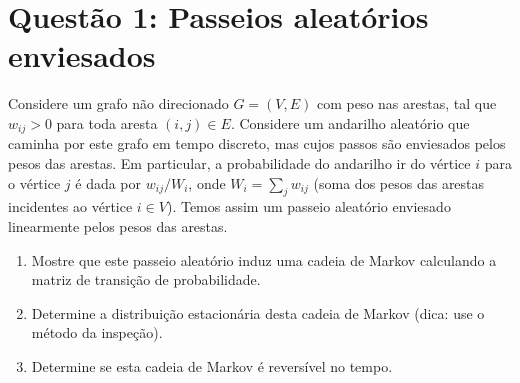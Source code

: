 \section*{Questão 1: Passeios aleatórios enviesados}
Considere um grafo não direcionado $G = (V,E)$ com peso nas arestas, tal que $w_{ij} > 0$ para toda aresta $(i, j) \in E$. Considere um andarilho aleatório que caminha por este grafo em tempo discreto, mas cujos passos são enviesados pelos pesos das arestas. Em particular, a probabilidade do andarilho ir do vértice $i$ para o vértice $j$ é dada por $w_{ij}/W_i$, onde $W_i = \sum_j w_{ij}$ (soma dos pesos das arestas incidentes ao vértice $i \in V$). Temos assim um passeio aleatório enviesado linearmente pelos pesos das arestas.

\begin{enumerate}
    \item Mostre que este passeio aleatório induz uma cadeia de Markov calculando a matriz de transição de probabilidade.
    \item Determine a distribuição estacionária desta cadeia de Markov (dica: use o método da inspeção).
    \item Determine se esta cadeia de Markov é reversível no tempo.
\end{enumerate}
